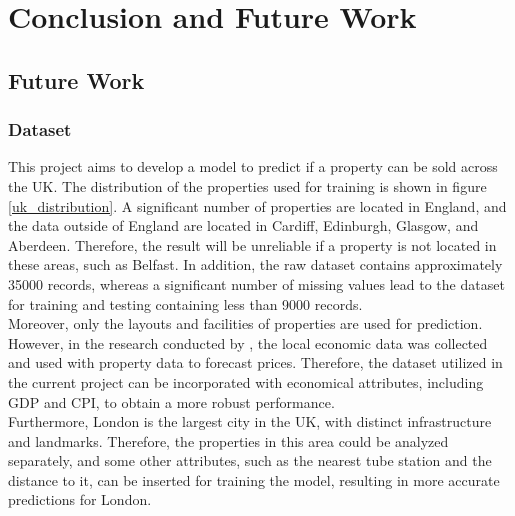 \documentclass[12pt,twoside]{report}
\begin{document}
\chapter{Conclusion and Future Work}
\section{Future Work}
\subsection{Dataset}
This project aims to develop a model to predict if a property can be sold across the UK. The distribution of the properties used for training is shown in figure \ref{uk_distribution}. A significant number of properties are located in England, and the data outside of England are located in Cardiff, Edinburgh, Glasgow, and Aberdeen. Therefore, the result will be unreliable if a property is not located in these areas, such as Belfast. In addition, the raw dataset contains approximately 35000 records, whereas a significant number of missing values lead to the dataset for training and testing containing less than 9000 records.
\\

Moreover, only the layouts and facilities of properties are used for prediction. However, in the research conducted by \citet{RN20}, the local economic data was collected and used with property data to forecast prices. Therefore, the dataset utilized in the current project can be incorporated with economical attributes, including GDP and CPI, to obtain a more robust performance. 
\\

Furthermore, London is the largest city in the UK, with distinct infrastructure and landmarks. Therefore, the properties in this area could be analyzed separately, and some other attributes, such as the nearest tube station and the distance to it, can be inserted for training the model, resulting in more accurate predictions for London. 
\end{document}
